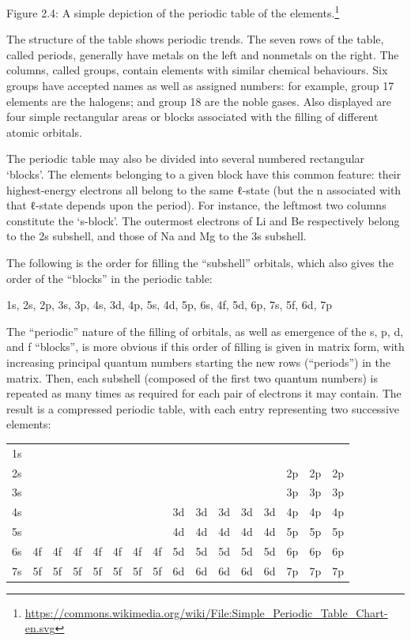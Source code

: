 \documentclass[
]{article}
\let\rmarkdownfootnote\footnote%
\def\footnote{\protect\rmarkdownfootnote}
\renewcommand{\href}[2]{#2\footnote{\url{#1}}}
\theoremstyle{definition}
\theoremstyle{definition}
\theoremstyle{definition}
\theoremstyle{remark}
\begin{document}
Figure 2.4:
\href{https://commons.wikimedia.org/wiki/File:Simple_Periodic_Table_Chart-en.svg}{A
simple depiction of the periodic table of the elements.}

The structure of the table shows periodic trends. The seven rows of the
table, called periods, generally have metals on the left and nonmetals
on the right. The columns, called groups, contain elements with similar
chemical behaviours. Six groups have accepted names as well as assigned
numbers: for example, group 17 elements are the halogens; and group 18
are the noble gases. Also displayed are four simple rectangular areas or
blocks associated with the filling of different atomic orbitals.

The periodic table may also be divided into several numbered rectangular
`blocks'. The elements belonging to a given block have this common
feature: their highest-energy electrons all belong to the same ℓ-state
(but the n associated with that ℓ-state depends upon the period). For
instance, the leftmost two columns constitute the `s-block'. The
outermost electrons of Li and Be respectively belong to the 2s subshell,
and those of Na and Mg to the 3s subshell.

The following is the order for filling the ``subshell'' orbitals, which
also gives the order of the ``blocks'' in the periodic table:

1s, 2s, 2p, 3s, 3p, 4s, 3d, 4p, 5s, 4d, 5p, 6s, 4f, 5d, 6p, 7s, 5f, 6d,
7p

The ``periodic'' nature of the filling of orbitals, as well as emergence
of the s, p, d, and f ``blocks'', is more obvious if this order of
filling is given in matrix form, with increasing principal quantum
numbers starting the new rows (``periods'') in the matrix. Then, each
subshell (composed of the first two quantum numbers) is repeated as many
times as required for each pair of electrons it may contain. The result
is a compressed periodic table, with each entry representing two
successive elements:

\begin{longtable}[]{@{}llllllllllllllll@{}}
\toprule
\endhead
1s & & & & & & & & & & & & & & &\tabularnewline
2s & & & & & & & & & & & & & 2p & 2p & 2p\tabularnewline
3s & & & & & & & & & & & & & 3p & 3p & 3p\tabularnewline
4s & & & & & & & & 3d & 3d & 3d & 3d & 3d & 4p & 4p & 4p\tabularnewline
5s & & & & & & & & 4d & 4d & 4d & 4d & 4d & 5p & 5p & 5p\tabularnewline
6s & 4f & 4f & 4f & 4f & 4f & 4f & 4f & 5d & 5d & 5d & 5d & 5d & 6p & 6p
& 6p\tabularnewline
7s & 5f & 5f & 5f & 5f & 5f & 5f & 5f & 6d & 6d & 6d & 6d & 6d & 7p & 7p
& 7p\tabularnewline
\bottomrule
\end{longtable}
\end{document}
